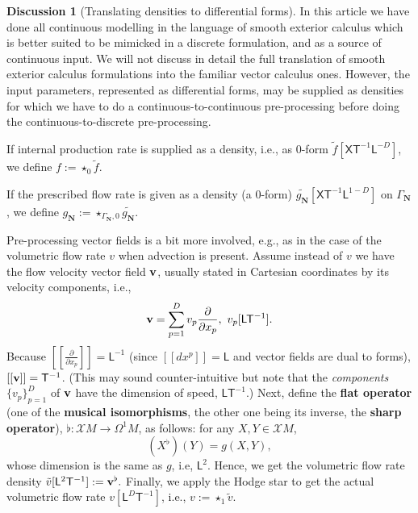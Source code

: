 \documentclass{elsarticle}
\theoremstyle{definition}
\newtheorem{discussion}[theorem]{Discussion}
\newcommand{\newterm}[1]{\textbf{#1}}
\newcommand{\amount}{\mathsf{X}}
\newcommand{\length}{\mathsf{L}}
\renewcommand{\time}{\mathsf{T}}
\newcommand{\Neumann}{\mathbf{N}}
\begin{document}
\begin{discussion}[Translating densities to differential forms]
  In this article we have done all continuous modelling in the language of smooth exterior calculus which is better suited to be mimicked in a discrete formulation, and as a source of continuous input.
  We will not discuss in detail the full translation of smooth exterior calculus formulations into the familiar vector calculus ones.
  However, the input parameters, represented as differential forms, may be supplied as densities for which we have to do a continuous-to-continuous pre-processing before doing the continuous-to-discrete pre-processing.

  If internal production rate is supplied as a density, i.e., as $0$-form
  $\tilde{f} [\amount \time^{-1} \length^{- D}]$,
  we define $f := \star_0 \tilde{f}$.

  If the prescribed flow rate is given as a density (a $0$-form)
  $\widetilde{g_\Neumann} [\amount \time^{-1} \length^{1 - D}]$ on $\Gamma_\Neumann$,
  we define
  $g_\Neumann := \star_{\Gamma_\Neumann, 0} \widetilde{g_\Neumann}$.

  Pre-processing vector fields is a bit more involved, e.g., as in the case of the volumetric flow rate $v$ when advection is present.
  Assume instead of $v$ we have the flow velocity vector field ${\bf v}$, usually stated in Cartesian coordinates by its velocity components, i.e.,
  \begin{equation}
    {\bf v} = \sum_{p = 1}^D v_p \frac{\partial}{\partial x_p},\ v_p [\length \time^{-1}].
  \end{equation}
  Because
  $[[\frac{\partial}{\partial x_p}]] = \length^{-1}$
  (since $[[d x^p]] = \length$ and vector fields are dual to forms),
  $[[{\bf v}]] = \time^{-1}$.
  (This may sound counter-intuitive but note that the \emph{components} $\{v_p\}_{p = 1}^{D}$ of ${\bf v}$ have the dimension of speed, $\length \time^{-1}$.)
  Next, define the \newterm{flat operator} (one of the \newterm{musical isomorphisms}, the other one being its inverse, the \newterm{sharp operator}),
  $\flat \colon \mathcal{X} M \to \Omega^1 M$,
  as follows: for any $X, Y \in \mathcal{X} M$,
  \begin{equation}
    (X^\flat)(Y) = g(X, Y),
  \end{equation}
  whose dimension is the same as $g$, i.e, $\length^2$.
  Hence, we get the volumetric flow rate density $\tilde{v} [\length^2 \time^{-1}] := {\bf v}^\flat.$
  Finally, we apply the Hodge star to get the actual volumetric flow rate $v [\length^D \time^{-1}]$, i.e.,
  $v := \star_1 \tilde{v}$.
\end{discussion}
\end{document}
